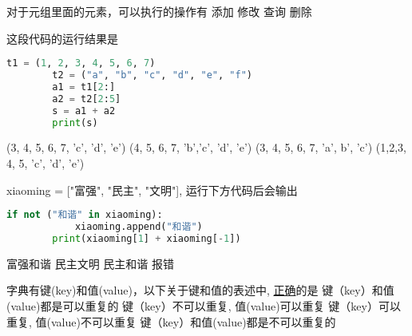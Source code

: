 \documentclass[hideanswer=true,
enfont=empty,	%
zhfont=empty,	%
mathfont=newtxmath,
]{cmcthesis}
\begin{document}
\begin{problem}
	对于元组里面的元素，可以执行的操作有         
	\options
	{ 添加 
}
	{  修改
}
	{ 查询}
	{  删除  }
\end{problem}

\begin{problem}
	这段代码的运行结果是          
		\begin{lstlisting}[style=tex, language=python]
		t1 = (1, 2, 3, 4, 5, 6, 7)
		t2 = ("a", "b", "c", "d", "e", "f")
		a1 = t1[2:]
		a2 = t2[2:5]
		s = a1 + a2
		print(s) 
	\end{lstlisting}

	\options
	{ (3, 4, 5, 6, 7, 'c', 'd', 'e') }
	{ (4, 5, 6, 7, 'b','c', 'd', 'e')                  }
	{  (3, 4, 5, 6, 7, 'a', b', 'c')                  }
	{ (1,2,3, 4, 5, 'c', 'd', 'e')                   }
\end{problem}

\begin{problem}
	 xiaoming = ["富强", "民主", "文明"], 运行下方代码后会输出          
	\begin{lstlisting}[style=tex, language=python]
		if not ("和谐" in xiaoming):
		    xiaoming.append("和谐")
		print(xiaoming[1] + xiaoming[-1]) 
	\end{lstlisting}
	
	\options
	{ 富强和谐 }
	{ 民主文明                  }
	{  民主和谐                  }
	{ 报错                   }
\end{problem}

\begin{problem}
	字典有键(key)和值(value)，以下关于键和值的表述中, \uline{正确}的是         	
	\options
	{ 键（key）和值(value)都是可以重复的 }
	{ 键（key）不可以重复, 值(value)可以重复                }
	{ 键（key）可以重复, 值(value)不可以重复                }
	{ 键（key）和值(value)都是不可以重复的                   }
\end{problem}


\end{document}
